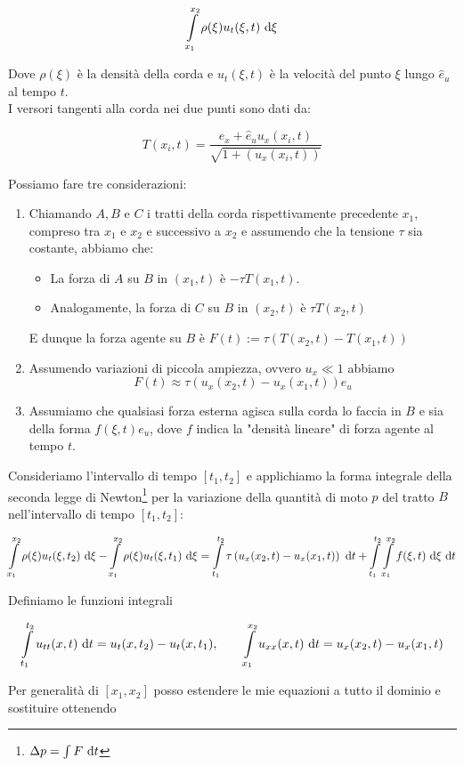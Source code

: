 \documentclass{article}
\begin{document}
\[ \intop_{x_1}^{x_2} \rho(\xi) u_t(\xi, t)\de \xi \]

Dove $\rho(\xi)$ è la densità della corda e $u_t(\xi,t)$ è la velocità del punto $\xi$ lungo $\hat{e}_u$ al tempo $t$.\\
I versori tangenti alla corda nei due punti sono dati da:

\[ T(x_i,t) = \frac{ \hat{e}_x + \hat{e}_u u_{x}(x_i,t) }{\sqrt{ 1+(u_{x}(x_i,t)) }} \]

Possiamo fare tre considerazioni:\begin{enumerate}
    \item Chiamando $A,B$ e $C$ i tratti della corda rispettivamente precedente $x_1$, compreso tra $x_1$ e $x_2$ e successivo a $x_2$ e assumendo che la tensione $\tau$ sia costante, abbiamo che:\begin{itemize}
        \item La forza di $A$ su $B$ in $(x_1,t)$ è $-\tau T(x_1, t)$.
        \item Analogamente, la forza di $C$ su $B$ in $(x_2,t)$ è $\tau T(x_2, t)$
    \end{itemize} 
    E dunque la forza agente su $B$ è $F(t) := \tau\left(T(x_2,t) - T(x_1,t)\right)$
    \item Assumendo variazioni di piccola ampiezza, ovvero $u_x \ll 1$ abbiamo
    \[ F(t) \approx \tau\left(u_x(x_2,t) - u_x(x_1,t)\right) e_u \]
    \item Assumiamo che qualsiasi forza esterna agisca sulla corda lo faccia in $B$ e sia della forma $f(\xi,t)e_u$, dove $f$ indica la "densità lineare" di forza agente al tempo $t$. 
\end{enumerate}
Consideriamo l'intervallo di tempo $[t_1, t_2]$ e applichiamo la forma integrale della seconda legge di Newton\footnote{$\Delta p = \int F\text{ d} t $} per la variazione della quantità di moto $p$ del tratto $B$ nell'intervallo di tempo $[t_1,t_2]$:

\[ \intop_{x_1}^{x_2} \rho(\xi) u_t(\xi, t_2)\de \xi - \intop_{x_1}^{x_2} \rho(\xi) u_t(\xi, t_1)\de \xi = \intop_{t_1}^{t_2} \tau\left(u_x(x_2,t) - u_x(x_1,t)\right) \de t + \intop_{t_1}^{t_2}\intop_{x_1}^{x_2} f(\xi,t) \de \xi \de t \]

Definiamo le funzioni integrali

\[ \intop_{t_1}^{t_2} u_{tt}(x, t) \de t = u_t(x,t_2) - u_t(x, t_1) ,\qquad \intop_{x_1}^{x_2} u_{xx}(x,t)\de t = u_x(x_2,t) - u_x(x_1, t) \]

Per generalità di $[x_1,x_2]$ posso estendere le mie equazioni a tutto il dominio e sostituire ottenendo
\end{document}
